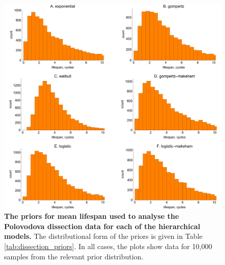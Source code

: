 \documentclass[12pt]{article}
\begin{document}
{\begin{figure}[ht]
	\centerline{\includegraphics[width=1\textwidth]{./Figure_files/dissection_lifespanPriorsParity.pdf}}
	\caption{\textbf{The priors for mean lifespan used to analyse the Polovodova dissection data for each of the hierarchical models.} The distributional form of the priors is given in Table \ref{tab:dissection_priors}. In all cases, the plots show data for 10,000 samples from the relevant prior distribution.}\label{fig:dissection_lifespanPriorsParity}
\end{figure}

}
\end{document}
